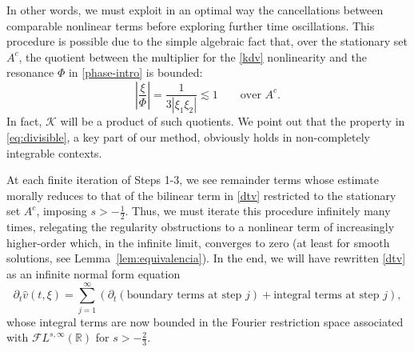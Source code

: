 \documentclass[a4paper,
11pt,  reqno]{amsart}
\newcommand{\5}{\textup{V}}
\newcommand{\dt}{\partial_t}
\theoremstyle{remark}
\newcommand{\R}{\mathbb{R}}
\numberwithin{equation}{section}
\numberwithin{theorem}{section}
\begin{document}
    \medskip

    In other words, we must exploit in an optimal way the cancellations between comparable nonlinear terms before exploring further time oscillations. This procedure is possible due to the simple algebraic fact that, over the stationary set $A^c$, the quotient between the multiplier for the \eqref{kdv} nonlinearity and the resonance $\Phi$ in \eqref{phase-intro} is bounded:
\begin{equation}\label{eq:divisible}
		\left|\frac{\xi}{\Phi}\right|=\frac{1}{3|\xi_1\xi_2|}\lesssim 1\qquad \mbox{over }A^c.
\end{equation}
In fact, $\mathcal{K}$ will be a product of such quotients.
		We point out that the property in \eqref{eq:divisible}, a key part of our method, obviously holds in non-completely integrable contexts.


    \medskip


At each finite iteration of Steps 1-3, we see remainder terms whose estimate morally reduces to that of the bilinear term in \eqref{dtv} restricted to the stationary set $A^c$,  imposing $s>-\frac12$. Thus, we must iterate this procedure infinitely many times,  relegating the regularity obstructions to a nonlinear term of increasingly higher-order which, in the infinite limit, converges to zero (at least for smooth solutions, see Lemma~\ref{lem:equivalencia}).
    In the end, we will have rewritten \eqref{dtv} as an infinite normal form equation
\begin{equation}\label{eq:nfe_intro}
		\dt\widehat{v}(t,\xi)=  \sum_{j=1}^\infty \left(\dt\left(\mbox{boundary terms at step } j\right)+ \mbox{integral terms at step }j\right),
	\end{equation}
	whose integral terms are now bounded in the Fourier restriction space associated with $\mathcal{F}L^{s,\infty}(\R)$ for $s>-\frac23$.
\end{document}
